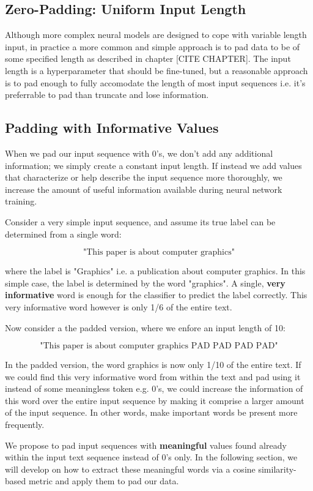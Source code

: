 \subsection{Zero-Padding: Uniform Input Length}
Although more complex neural models are designed to cope with variable length input,
in practice a more common and simple approach is to pad data to be of some specified
length as described in chapter [CITE CHAPTER]. The input length is a hyperparameter
that should be fine-tuned, but a reasonable approach is to pad enough to fully accomodate
the length of most input sequences i.e. it’s preferrable to pad than truncate and lose
information.

\subsection{Padding with Informative Values}
When we pad our input sequence with 0’s, we don’t add any additional information; we
simply create a constant input length. If instead we add values that characterize or help
describe the input sequence more thoroughly, we increase the amount of useful information
available during neural network training.

Consider a very simple input sequence, and assume its true label can be determined
from a single word:

\[\text{"This paper is about computer graphics"}\]

where the label is "Graphics" i.e. a publication about computer graphics.
In this simple case, the label is determined by the word "graphics". A single, \textbf{very
informative} word is enough for the classifier to predict the label correctly. This very
informative word however is only 1/6 of the entire text.

Now consider a the padded version, where we enfore an input length of 10:

\[\text{"This paper is about computer graphics PAD PAD PAD PAD"}\]

In the padded version, the word graphics is now only 1/10 of the entire text. If we
could find this very informative word from within the text and pad using it instead of some
meaningless token e.g. 0's, we could increase the information of this word over the entire
input sequence by making it comprise a larger amount of the input sequence. In other
words, make important words be present more frequently.

We propose to pad input sequences with \textbf{meaningful} values found already within the
input text sequence instead of 0's only. In the following section, we will develop on how to
extract these meaningful words via a cosine similarity-based metric and apply them to pad
our data.


